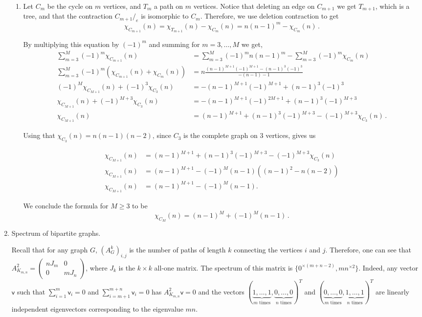 \documentclass[kulak]{tplt}
\theoremstyle{definition}
\newcommand{\vv}{\mathsf{v}}
\begin{document}
\begin{enumerate}
\begin{enumerate}
\item 
Let $C_m$ be the cycle on $m$ vertices, and $T_m$ a path on $m$ vertices.
Notice that deleting an edge on $C_{m+1}$ we get $T_{m+1}$, which is a tree, and that the contraction $C_{m+1}/_e$ is isomorphic to $C_m$.
Therefore, we use deletion contraction to get 
$$\chi_{C_{m+1}}(n) =  \chi_{T_{m+1}}(n) - \chi_{C_m}(n) =  n(n-1)^m - \chi_{C_m}(n) \, . $$

By multiplying this equation by $(-1)^m$ and summing for $m=3, \ldots, M$ we get,
\begin{align*}
\sum_{m=3}^M (-1)^m\chi_{C_{m+1}}(n) &= \sum_{m=3}^M (-1)^m n(n-1)^m - \sum_{m=3}^M (-1)^m \chi_{C_{m}}(n) \\
\sum_{m=3}^M (-1)^m(\chi_{C_{m+1}}(n) + \chi_{C_{m}}(n) ) &= n \frac{(n-1)^{M+1}(-1)^{M+1} - (n-1)^3(-1)^3}{-(n-1) -  1}\\
(-1)^M \chi_{C_{M+1}}(n) + (-1)^3 \chi_{C_{3}}(n) &= -(n-1)^{M+1}(-1)^{M+1} + (n-1)^3(-1)^3\\
\chi_{C_{M+1}}(n) + (-1)^{M+3} \chi_{C_{3}}(n) &= -(n-1)^{M+1}(-1)^{2M+1} + (n-1)^3(-1)^{M+3}\\
\chi_{C_{M+1}}(n) &= (n-1)^{M+1} + (n-1)^3(-1)^{M+3} - (-1)^{M+3} \chi_{C_{3}}(n)\, . 
\end{align*}

Using that $\chi_{C_{3}}(n) = n(n-1)(n-2)$, since $C_{3}$ is the complete graph on $3$ vertices, gives us

\begin{align*}
\chi_{C_{M+1}}(n) &= (n-1)^{M+1} + (n-1)^3(-1)^{M+3} - (-1)^{M+3} \chi_{C_{3}}(n)\\
\chi_{C_{M+1}}(n) &= (n-1)^{M+1} - (-1)^M(n-1)\left( (n-1)^2 - n(n-2) \right) \\
\chi_{C_{M+1}}(n) &= (n-1)^{M+1} - (-1)^M(n-1).
\end{align*}

We conclude the formula for $M\geq 3$ to be
$$\chi_{C_M}(n) = (n-1)^M + (-1)^M(n-1) \, . $$
\end{enumerate}


\item Spectrum of bipartite graphs.

Recall that for any graph $G$, $(A_G^k)_{i, j}$ is the number of paths of length $k$ connecting the vertices $i$ and $j$.
Therefore, one can see that $A_{K_{m, n}}^2 = \begin{pmatrix}
n J_m & 0 \\ 0 & mJ_n
\end{pmatrix}$, where $J_k$ is the $k\times k$ all-one matrix.
The spectrum of this matrix is $\{ 0 ^{\times (m+n-2) }, mn^{\times 2}\}$.
Indeed, any vector $\vv $ such that $\sum_{i=1}^m \vv_i = 0$ and $\sum_{i=m+1}^{m+n} \vv_i = 0$ has $A_{K_{m, n}}^2\vv =0 $ and the vectors $(\underbrace{1, \ldots, 1}_{m \text{ times}}, \underbrace{0, \ldots, 0}_{n \text{ times}})^T$ and  $ (\underbrace{0, \ldots, 0}_{m \text{ times}}, \underbrace{1, \ldots, 1}_{n \text{ times}})^T$ are linearly independent eigenvectors corresponding to the eigenvalue $mn$.


\end{enumerate}
\end{document}

